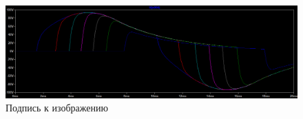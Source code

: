 \documentclass[a4paper, 12pt]{article}
\begin{document}
    \begin{figure}[H]
        \centering
        \includegraphics[scale=0.45]{R2_L20m_C45u.png}
        \captionsetup{skip=0pt}
        \caption{Подпись к изображению}
        \label{fig:R2_L20m_C45u}
    \end{figure}
\end{document}
